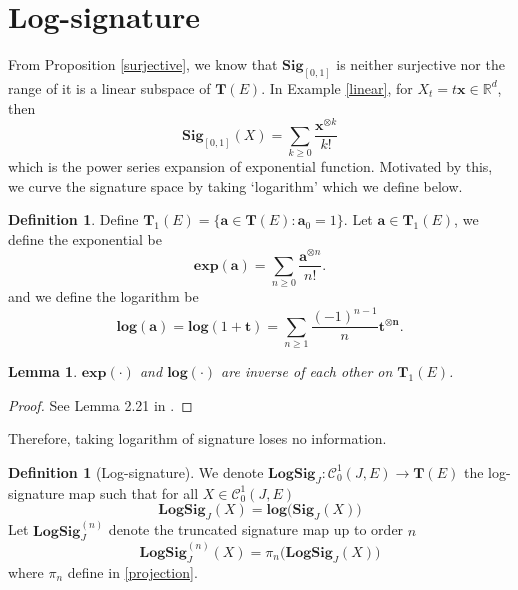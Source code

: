 \documentclass[12pt]{report}
\newtheorem{lemma}[theorem]{Lemma}
\theoremstyle{definition}
\newtheorem{definition}[theorem]{Definition}
\theoremstyle{remark}
\newcommand{\R}{\mathbb{R}}
\begin{document}
\section{Log-signature}
From Proposition \ref{surjective}, we know that $\mathbf{Sig}_{[0,1]}$ is neither surjective nor the range of it is a linear subspace of $\mathbf{T}(E)$. In Example \ref{linear}, for $X_{t} = t\mathbf{x} \in \R^{d}$, then 
  \begin{equation}
    \mathbf{Sig}_{[0,1]}(X) = \sum_{k\geq 0}\frac{\mathbf{x}^{\otimes k}}{k!}
  \end{equation}
  which is the power series expansion of exponential function. Motivated by this, we curve the signature space by taking `logarithm' which we define below. 
\begin{definition}
  Define $\mathbf{T}_{1}(E) = \{\mathbf{a} \in \mathbf{T}(E)\colon \mathbf{a}_{0} = 1\}$. Let $\mathbf{a} \in \mathbf{T}_{1}(E)$, we define the exponential be 
  \begin{equation}
    \mathbf{exp}(\mathbf{a}) = \sum_{n\geq 0}\frac{\mathbf{a}^{\otimes n}}{n!}.
  \end{equation}
  and we define the logarithm be
  \begin{equation}
    \mathbf{log}(\mathbf{a}) = \mathbf{log}(1+\mathbf{t}) = \sum_{n\geq 1} \frac{(-1)^{n-1}}{n}\mathbf{t}^{\otimes \mathbf{n}}.
  \end{equation}
\end{definition}
\begin{lemma}
  $\mathbf{exp}(\cdot)$ and $\mathbf{log}(\cdot)$ are inverse of each other on $\mathbf{T}_{1}(E)$.
\end{lemma}
\begin{proof}
  See Lemma 2.21 in \cite{lyons2007differential}.
\end{proof}
Therefore, taking logarithm of signature loses no information.
\begin{definition}[Log-signature]
  We denote $\mathbf{LogSig}_{J} \colon \mathcal{C}^{1}_{0}(J,E) \to \mathbf{T}(E)$ the log-signature map such that for all $X \in \mathcal{C}^{1}_{0}(J,E)$
  \begin{equation}
    \mathbf{LogSig}_{J}(X) = \mathbf{log}\big(\mathbf{Sig}_{J}(X)\big)
  \end{equation}
  Let $\mathbf{LogSig}^{(n)}_{J}$ denote the truncated signature map up to order $n$
  \begin{equation}
    \mathbf{LogSig}^{(n)}_{J}(X) = \pi_{n}\big(\mathbf{LogSig}_{J}(X)\big)
  \end{equation}
  where $\pi_n$ define in \eqref{projection}.
\end{definition}
\end{document}
